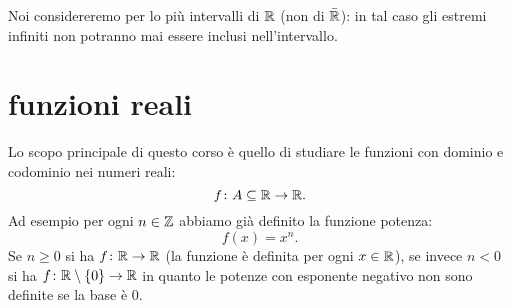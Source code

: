 Noi considereremo per lo più intervalli di $\mathbb R$ (non di $\bar {\mathbb R}$): in tal
caso gli estremi infiniti non potranno mai essere inclusi nell'intervallo.

\begin{comment}
Finora abbiamo sempre supposto $a \le b$.
Se invece $a>b$ potremmo definire per convenzione:
\begin{equation}\label{eq:488364}
  [a,b] = [b,a], \quad
  [a,b) = (b,a], \quad
  (a,b] = [b,a), \quad
  (a,b) = (b,a).
\end{equation}
Si faccia però attenzione che in altri testi gli intervalli con gli estremi
scambiati non vengono definiti oppure vengono considerati vuoti.

La convenzione può essere utile perché in generale se $\vec a, \vec b$ sono
elementi di uno spazio vettoriale reale $V$ allora ha senso
definire:
\begin{align*}
    [\vec a,\vec b] &= \ENCLOSE{(1-t)\vec a + t \vec b\colon t\in [0,1]},\\
    [\vec a,\vec b) &= \ENCLOSE{(1-t)\vec a + t \vec b\colon t\in [0,1)},\\
    (\vec a,\vec b] &= \ENCLOSE{(1-t)\vec a + t \vec b\colon t\in (0,1]},\\
    (\vec a,\vec b) &= \ENCLOSE{(1-t)\vec a + t \vec b\colon t\in (0,1)}.
\end{align*}
L'intervallo $[\vec a,\vec b]$ è quindi il segmento di estremi
$\vec a$ e $\vec b$ e può essere definito anche se sullo spazio
vettoriale non è dato un ordinamento.
Ma questo rimane coerente con la definizione~\eqref{eq:499494}
data sopra solamente se adottiamo la convenzione~\eqref{eq:488364}.
\end{comment}


\section{funzioni reali}

Lo scopo principale di questo corso è quello di studiare le
funzioni con dominio e codominio nei numeri reali:
\[
  f \colon A \subseteq \mathbb R \to \mathbb R.
\]
Ad esempio per ogni $n\in \mathbb Z$ abbiamo già definito la funzione
potenza:
\[
  f(x) = x^n.
\]
Se $n\ge 0$ si ha $f\colon \mathbb R \to \mathbb R$ (la funzione è definita
per ogni $x\in \mathbb R$), se invece $n<0$ si ha
$f\colon \mathbb R\setminus{\left\{ 0 \right\}}\to \mathbb R$ in quanto le potenze
con esponente negativo non sono definite se la base è $0$.


